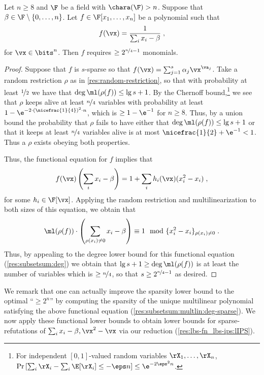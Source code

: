 \documentclass{toc}
\begin{document}
\begin{proposition}
        Let $n\ge 8$ and $\F$ be a field with $\chara(\F)>n$.  Suppose that $\beta\in \F\setminus\{0,\ldots,n\}$.  Let $f\in\F[x_1,\ldots,x_n]$ be a polynomial such that
        \[
                f(\vx)=\frac{1}{\sum_i x_i-\beta}
                \;,
        \]
        for $\vx\in\bits^n$. Then $f$ requires $\ge 2^{\nicefrac{n}{4}-1}$ monomials.
\end{proposition}
\begin{proof}
        Suppose that $f$ is $s$-sparse so that $f(\vx)=\sum_{j=1}^s \alpha_j\vx^{\va_j}$. Take a random restriction $\rho$ as in \autoref{res:random-restriction}, so that with probability at least $\nicefrac{1}{2}$ we have that $\deg \ml(\rho(f))\le \lg s+1$.  By the Chernoff bound,\footnote{For independent $[0,1]$-valued random variables $\rX_1,\ldots,\rX_n$, $\Pr\left[\sum_i \rX_i -\sum_i\E[\rX_i]\le-\eps n\right]\le \e^{-2\eps^2n}$.} we see that $\rho$ keeps alive at least $\nicefrac{n}{4}$ variables with probability at least $1-\e^{-2\cdot (\nicefrac{1}{4})^2\cdot n}$, which is $\ge 1-\e^{-1}$ for $n\ge 8$.
        Thus, by a union bound the probability that $\rho$ fails to have either that $\deg\ml(\rho(f))\le \lg s+1$ or that it keeps at least $\nicefrac{n}{4}$ variables alive is at most $\nicefrac{1}{2}+\e^{-1}<1$.  Thus a $\rho$ exists obeying both properties.

        Thus, the functional equation for $f$ implies that
        \[
                f(\vx)\left(\sum_i x_i-\beta\right)=1+\sum_i h_i(\vx) (x_i^2-x_i)
                \;,
        \]
        for some $h_i\in\F[\vx]$.  Applying the random restriction and multilinearization to both sizes of this equation, we obtain that
        \[
                \ml(\rho(f))\cdot \left(\sum_{\rho(x_i)\ne 0} x_i-\beta\right)\equiv 1 \mod \{x_i^2-x_i\}_{\rho(x_i)\ne 0}
                \;.
        \]
        Thus, by appealing to the degree lower bound for this functional equation (\autoref{res:subsetsum:deg}) we obtain that $\lg s+1\ge \deg\ml(\rho(f))$ is at least the number of variables which is $\ge \nicefrac{n}{4}$, so that $s\ge 2^{\nicefrac{n}{4}-1}$ as desired.
\end{proof}

We remark that one can actually improve the sparsity lower bound to the optimal ``$\ge 2^n$'' by computing the sparsity of the unique multilinear polynomial satisfying the above functional equation (\autoref{res:subsetsum:multlin:deg-sparse}). We now apply these functional lower bounds to obtain lower bounds for sparse-\lIPS refutations of $\sum_i x_i-\beta,\vx^2-\vx$ via our reduction (\autoref{res:lbs-fn_lbs-ips:lIPS}).
\end{document}
